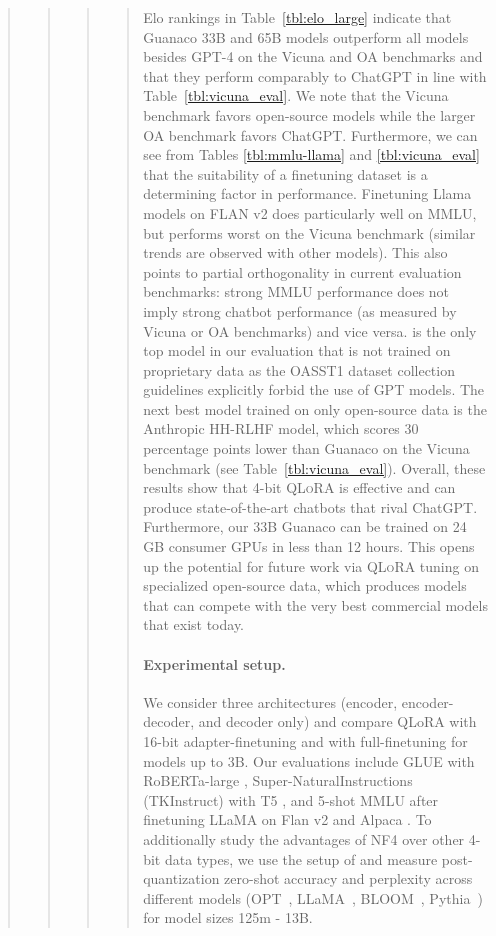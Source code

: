 \begin{quote}
\begin{quote}
\begin{quote}
\begin{quote}
Elo rankings in Table~\ref{tbl:elo_large} indicate that {Guanaco} 33B and 65B models outperform all models besides GPT-4 on the Vicuna and OA benchmarks and that they perform comparably to ChatGPT in line with Table~\ref{tbl:vicuna_eval}. We note that the Vicuna benchmark favors open-source models while the larger OA benchmark favors ChatGPT. Furthermore, we can see from Tables \ref{tbl:mmlu-llama} and \ref{tbl:vicuna_eval} that the suitability of a finetuning dataset is a determining factor in performance. Finetuning Llama models on FLAN v2 does particularly well on MMLU, but performs worst on the Vicuna benchmark (similar trends are observed with other models). This also points to partial orthogonality in current evaluation benchmarks: strong MMLU performance does not imply strong chatbot performance (as measured by Vicuna or OA benchmarks) and vice versa.
 is the only top model in our evaluation that is not trained on proprietary data as the OASST1 dataset collection guidelines explicitly forbid the use of GPT models. The next best model trained on only open-source data is the Anthropic HH-RLHF model, which scores 30 percentage points lower than {Guanaco} on the Vicuna benchmark (see Table~\ref{tbl:vicuna_eval}). Overall, these results show that 4-bit \textsc{QLoRA} is effective and can produce state-of-the-art chatbots that rival ChatGPT. Furthermore, our 33B {Guanaco} can be trained on 24 GB consumer GPUs in less than 12 hours. This opens up the potential for future work via \textsc{QLoRA} tuning on specialized open-source data, which produces models that can compete with the very best commercial models that exist today. 

\paragraph{Experimental setup.} We consider three architectures (encoder, encoder-decoder, and decoder only) and compare QLoRA with 16-bit adapter-finetuning and with full-finetuning for models up to 3B. Our evaluations include GLUE \citep{wang2018glue} with RoBERTa-large \citep{liu2019roberta},  Super-NaturalInstructions (TKInstruct) \citep{wang2022super} with T5 \citep{t5}, and 5-shot MMLU \citep{hendrycksmeasuring} after finetuning LLaMA on Flan v2 \citep{longpre2023flan} and Alpaca \citep{alpaca}. To additionally study the advantages of NF4 over other 4-bit data types, we use the setup of \citet{dettmers2022case} and measure post-quantization zero-shot accuracy and perplexity across different models (OPT~\citep{zhang2022opt}, LLaMA~\citep{touvron2023llama}, BLOOM~\citep{scao2022bloom}, Pythia~\citep{biderman2023pythia}) for model sizes 125m - 13B. 


\end{quote}
\end{quote}
\end{quote}
\end{quote}

